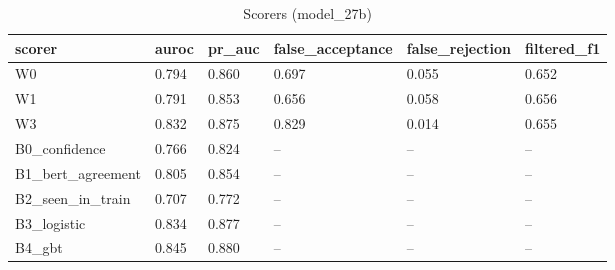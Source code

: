 \begin{table}[t]
\centering
\small
\begin{tabular}{llllll}
\hline
scorer & auroc & pr\_auc & false\_acceptance & false\_rejection & filtered\_f1 \\
\hline
W0 & 0.794 & 0.860 & 0.697 & 0.055 & 0.652 \\
W1 & 0.791 & 0.853 & 0.656 & 0.058 & 0.656 \\
W3 & 0.832 & 0.875 & 0.829 & 0.014 & 0.655 \\
B0\_confidence & 0.766 & 0.824 & -- & -- & -- \\
B1\_bert\_agreement & 0.805 & 0.854 & -- & -- & -- \\
B2\_seen\_in\_train & 0.707 & 0.772 & -- & -- & -- \\
B3\_logistic & 0.834 & 0.877 & -- & -- & -- \\
B4\_gbt & 0.845 & 0.880 & -- & -- & -- \\
\hline
\end{tabular}
\caption{Scorers (model\_27b)}
\label{tab:scorers_model_27b}
\end{table}
